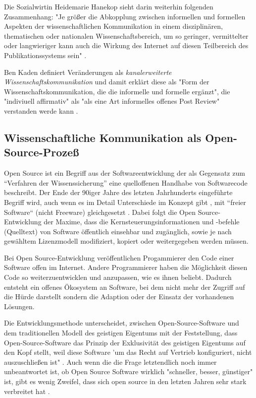 Die Sozialwirtin Heidemarie Hanekop sieht darin weiterhin folgenden Zusammenhang: "Je größer die Abkopplung zwischen informellen und formellen Aspekten der wissenschaftlichen Kommunikation in einem disziplinären, thematischen oder nationalen Wissenschaftsbereich, um so geringer, vermittelter oder langwieriger kann auch die Wirkung des Internet auf diesen Teilbereich des Publikationssystems sein" \cite{Hanekop_2014}.

Ben Kaden definiert Veränderungen als \textit{kanalerweiterte Wissenschaftskommunikation} und damit erklärt diese als "Form der Wissenschaftskommunikation, die die informelle und formelle ergänzt", die "indiviuell affirmativ" als "als eine Art informelles offenes Post Review" verstanden werde kann \cite{kaden_2009_library}.

\subsection{Wissenschaftliche Kommunikation als Open-Source-Prozeß}
Open Source ist ein Begriff aus der Softwareentwicklung der als Gegensatz zum “Verfahren der Wissenssicherung” \cite{stallman2002} eine quelloffenen Handhabe von Softwarecode beschreibt. Der Ende der 90iger Jahre des letzten Jahrhunderts eingeführte Begriff wird, auch wenn es im Detail Unterschiede im Konzept gibt \cite{suchen}, mit “freier Software“ (nicht Freeware) gleichgesetzt \cite{suchen}. Dabei folgt die Open Source-Entwicklung der Maxime, dass die Kernsteuerungsinformationen und -befehle (Quelltext) von Software öffentlich einsehbar und zugänglich, sowie je nach gewähltem Lizenzmodell modifiziert, kopiert oder weitergegeben werden müssen\cite{suchen}.

Bei Open Source-Entwicklung veröffentlichen Progammierer den Code einer Software offen im Internet. Andere Programmierer haben die Möglichkeit diesen Code so weiterzuentwicklen und anzupassen, wie es ihnen beliebt. Dadurch entsteht ein offenes Ökosystem an Software, bei dem nicht mehr der Zugriff auf die Hürde darstellt sondern die Adaption oder der Einsatz der vorhandenen Lösungen.

Die Entwicklungsmethode unterscheidet, zwischen Open-Source-Software und dem traditionellen Modell des geistigen Eigentums mit der Feststellung, dass Open-Source-Software das Prinzip der Exklusivität des geistigen Eigentums auf den Kopf stellt, weil diese Software 'um das Recht auf Vertrieb konfiguriert, nicht auszuschließen ist" \cite{suchen}. Auch wenn die die Frage letztendlich noch immer unbeantwortet ist, ob Open Source Software wirklich "schneller, besser, günstiger" ist, gibt es wenig Zweifel, dass sich open source in den letzten Jahren sehr stark verbreitet hat \cite{Lerner_2001}.

